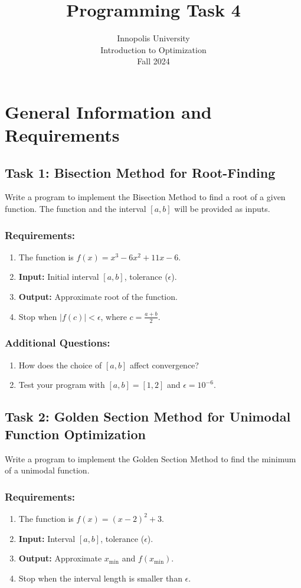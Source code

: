 \documentclass[12pt]{article}
\title{Programming Task 4}
\author{Innopolis University\\ Introduction to Optimization\\ Fall 2024}
\date{}
\begin{document}
\maketitle

\section*{General Information and Requirements}

\subsection*{Task 1: Bisection Method for Root-Finding}
Write a program to implement the Bisection Method to find a root of a given function. The function and the interval $[a, b]$ will be provided as inputs.

\subsubsection*{Requirements:}
\begin{enumerate}
    \item The function is $f(x) = x^3 - 6x^2 + 11x - 6$.
    \item \textbf{Input:} Initial interval $[a, b]$, tolerance ($\epsilon$).
    \item \textbf{Output:} Approximate root of the function.
    \item Stop when $|f(c)| < \epsilon$, where $c = \frac{a+b}{2}$.
\end{enumerate}

\subsubsection*{Additional Questions:}
\begin{enumerate}
    \item How does the choice of $[a, b]$ affect convergence?
    \item Test your program with $[a, b] = [1, 2]$ and $\epsilon = 10^{-6}$.
\end{enumerate}

\subsection*{Task 2: Golden Section Method for Unimodal Function Optimization}
Write a program to implement the Golden Section Method to find the minimum of a unimodal function.

\subsubsection*{Requirements:}
\begin{enumerate}
    \item The function is $f(x) = (x - 2)^2 + 3$.
    \item \textbf{Input:} Interval $[a, b]$, tolerance ($\epsilon$).
    \item \textbf{Output:} Approximate $x_{\text{min}}$ and $f(x_{\text{min}})$.
    \item Stop when the interval length is smaller than $\epsilon$.
\end{enumerate}
\end{document}
